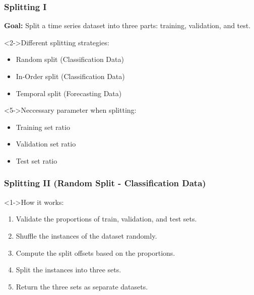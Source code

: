 \documentclass[t,english]{beamer}
\begin{document}
\begin{frame}
  \frametitle{Splitting I}
  \textbf{Goal:} Split a time series dataset into three parts: training, validation, and test.

  \begin{block}<2->{Different splitting strategies:}
    \begin{itemize}
      \item<2-> Random split (Classification Data)
      \item<3-> In-Order split (Classification Data)
      \item<4-> Temporal split (Forecasting Data)
    \end{itemize}
  \end{block}

  \begin{block}<5->{Neccessary parameter when splitting:}
    \begin{itemize}
      \item<5-> Training set ratio
      \item<6-> Validation set ratio
      \item<7-> Test set ratio
    \end{itemize}
  \end{block}
\end{frame}

\begin{frame}
  \frametitle{Splitting II (Random Split - Classification Data)}
  \begin{block}<1->{How it works:}
    \begin{enumerate}
      \item<1-> Validate the proportions of train, validation, and test sets.
      \item <2-> Shuffle the instances of the dataset randomly.
      \item <3-> Compute the split offsets based on the proportions.
      \item <4-> Split the instances into three sets.
      \item <5-> Return the three sets as separate datasets.
    \end{enumerate}
  \end{block}
\end{frame}
\end{document}
